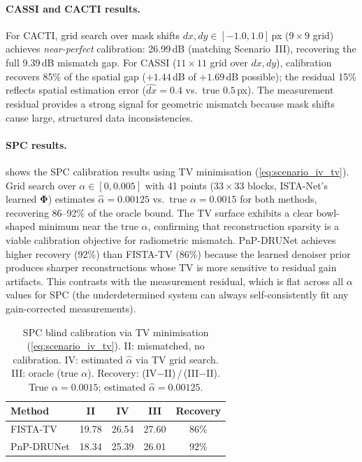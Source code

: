 \documentclass[runningheads]{llncs}
\begin{document}
\paragraph{CASSI and CACTI results.}
For CACTI, grid search over mask shifts $dx, dy \in [-1.0, 1.0]$\,px ($9 \times 9$ grid) achieves \emph{near-perfect} calibration: 26.99\,dB (matching Scenario~III), recovering the full 9.39\,dB mismatch gap.
For CASSI ($11 \times 11$ grid over $dx, dy$), calibration recovers 85\% of the spatial gap ($+1.44$\,dB of $+1.69$\,dB possible); the residual 15\% reflects spatial estimation error ($\hat{dx}{=}0.4$ vs.\ true $0.5$\,px).
The measurement residual provides a strong signal for geometric mismatch because mask shifts cause large, structured data inconsistencies.

\paragraph{SPC results.}
 shows the SPC calibration results using TV minimisation (\cref{eq:scenario_iv_tv}).
Grid search over $\alpha \in [0, 0.005]$ with 41 points ($33 \times 33$ blocks, ISTA-Net's learned $\mathbf{\Phi}$) estimates $\hat{\alpha} = 0.00125$ vs.\ true $\alpha = 0.0015$ for both methods, recovering 86--92\% of the oracle bound.
The TV surface exhibits a clear bowl-shaped minimum near the true $\alpha$, confirming that reconstruction sparsity is a viable calibration objective for radiometric mismatch.
PnP-DRUNet achieves higher recovery (92\%) than FISTA-TV (86\%) because the learned denoiser prior produces sharper reconstructions whose TV is more sensitive to residual gain artifacts.
This contrasts with the measurement residual, which is flat across all $\alpha$ values for SPC (the underdetermined system can always self-consistently fit any gain-corrected measurements).

\begin{table}[t]
\centering
\caption{SPC blind calibration via TV minimisation (\cref{eq:scenario_iv_tv}). II: mismatched, no calibration. IV: estimated $\hat{\alpha}$ via TV grid search. III: oracle (true $\alpha$). Recovery: (IV$-$II)\,/\,(III$-$II). True $\alpha{=}0.0015$; estimated $\hat{\alpha}{=}0.00125$.}
\label{tab:spc_scenario_iv}
\begin{tabular}{@{}lcccc@{}}
\toprule
\textbf{Method} & \textbf{II} & \textbf{IV} & \textbf{III} & \textbf{Recovery} \\
\midrule
FISTA-TV   & 19.78 & 26.54 & 27.60 & 86\% \\
PnP-DRUNet & 18.34 & 25.39 & 26.01 & 92\% \\
\bottomrule
\end{tabular}
\end{table}
\end{document}
